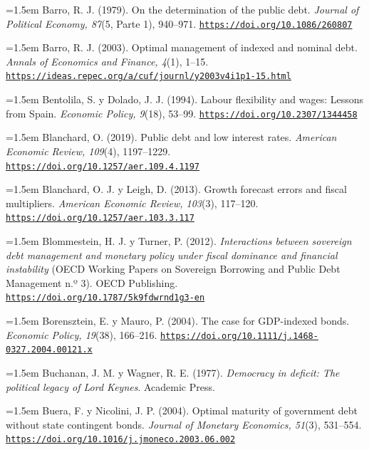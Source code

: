 \documentclass[10pt,a4paper]{article}
\begin{document}
\noindent\hangindent=1.5em Barro, R. J. (1979). On the determination of the public debt. \textit{Journal of Political Economy, 87}(5, Parte 1), 940--971. \href{https://doi.org/10.1086/260807}{\nolinkurl{https://doi.org/10.1086/260807}}

\noindent\hangindent=1.5em Barro, R. J. (2003). Optimal management of indexed and nominal debt. \textit{Annals of Economics and Finance, 4}(1), 1--15. \href{https://ideas.repec.org/a/cuf/journl/y2003v4i1p1-15.html}{\nolinkurl{https://ideas.repec.org/a/cuf/journl/y2003v4i1p1-15.html}}

\noindent\hangindent=1.5em Bentolila, S. y Dolado, J. J. (1994). Labour flexibility and wages: Lessons from Spain. \textit{Economic Policy, 9}(18), 53--99. \href{https://doi.org/10.2307/1344458}{\nolinkurl{https://doi.org/10.2307/1344458}}

\noindent\hangindent=1.5em Blanchard, O. (2019). Public debt and low interest rates. \textit{American Economic Review, 109}(4), 1197--1229. \href{https://doi.org/10.1257/aer.109.4.1197}{\nolinkurl{https://doi.org/10.1257/aer.109.4.1197}}

\noindent\hangindent=1.5em Blanchard, O. J. y Leigh, D. (2013). Growth forecast errors and fiscal multipliers. \textit{American Economic Review, 103}(3), 117--120. \href{https://doi.org/10.1257/aer.103.3.117}{\nolinkurl{https://doi.org/10.1257/aer.103.3.117}}

\noindent\hangindent=1.5em Blommestein, H. J. y Turner, P. (2012). \textit{Interactions between sovereign debt management and monetary policy under fiscal dominance and financial instability} (OECD Working Papers on Sovereign Borrowing and Public Debt Management n.º 3). OECD Publishing. \href{https://doi.org/10.1787/5k9fdwrnd1g3-en}{\nolinkurl{https://doi.org/10.1787/5k9fdwrnd1g3-en}}

\noindent\hangindent=1.5em Borensztein, E. y Mauro, P. (2004). The case for GDP-indexed bonds. \textit{Economic Policy, 19}(38), 166--216. \href{https://doi.org/10.1111/j.1468-0327.2004.00121.x}{\nolinkurl{https://doi.org/10.1111/j.1468-0327.2004.00121.x}}

\noindent\hangindent=1.5em Buchanan, J. M. y Wagner, R. E. (1977). \textit{Democracy in deficit: The political legacy of Lord Keynes}. Academic Press.

\noindent\hangindent=1.5em Buera, F. y Nicolini, J. P. (2004). Optimal maturity of government debt without state contingent bonds. \textit{Journal of Monetary Economics, 51}(3), 531--554. \href{https://doi.org/10.1016/j.jmoneco.2003.06.002}{\nolinkurl{https://doi.org/10.1016/j.jmoneco.2003.06.002}}
\end{document}
